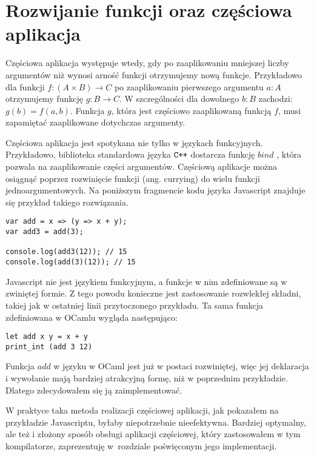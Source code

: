 \documentclass[declaration,shortabstract]{iithesis}
\begin{document}

\section{Rozwijanie funkcji oraz częściowa aplikacja}

Częściowa aplikacja występuje wtedy, gdy po zaaplikowaniu mniejszej liczby 
argumentów niż wynosi arność funkcji otrzymujemy nową funkcje. Przykładowo 
dla funkcji $f: (A \times B) \rightarrow C$ po zaaplikowaniu pierwszego 
argumentu $a : A$ otrzymujemy funkcję $g : B \rightarrow C$. W szczególności
dla dowolnego $b : B$ zachodzi: $g(b) = f(a, b)$. Funkcja $g$, która jest 
częściowo zaaplikowaną funkcją $f$, musi zapamiętać zaaplikowane dotychczas 
argumenty. 

Częściowa aplikacja jest spotykana nie tylko w językach funkcyjnych. 
Przykładowo, biblioteka standardowa języka $\verb!C++!$ dostarcza funkcję
$bind$ \cite{cpp_bind}, która pozwala na zaaplikowanie części argumentów. 
Częściową aplikacje można osiągnąć poprzez rozwinięcie funkcji (ang. currying) 
do wielu funkcji jednoargumentowych. Na poniższym fragmencie kodu języka 
Javascript znajduje się przykład takiego rozwiązania.

\begin{lstlisting}[frame=single, caption=Rozwinięcie funkcji w Javascriptcie.]
var add = x => (y => x + y);
var add3 = add(3);

console.log(add3(12)); // 15
console.log(add(3)(12)); // 15
\end{lstlisting}

Javascript nie jest językiem funkcyjnym, a funkcje w nim zdefiniowane są w 
zwiniętej formie. Z tego powodu konieczne jest zastosowanie rozwlekłej składni,
takiej jak w ostatniej linii przytoczonego przykładu. Ta sama funkcja 
zdefiniowana w OCamlu wygląda następująco:

\begin{lstlisting}[frame=single, caption=Rozwinięta funkcja w OCamlu.]
let add x y = x + y 
print_int (add 3 12)
\end{lstlisting}

Funkcja $add$ w języku w OCaml jest już w postaci rozwiniętej, więc jej 
deklaracja i wywołanie mają bardziej atrakcyjną formę, niż w poprzednim 
przykładzie. Dlatego zdecydowałem się ją zaimplementować.

W praktyce taka metoda realizacji częściowej aplikacji, jak pokazałem na 
przykładzie Javascriptu, byłaby niepotrzebnie nieefektywna. Bardziej optymalny,
ale też i złożony sposób obsługi aplikacji częściowej, który zastosowałem w tym 
kompilatorze, zaprezentuję w~rozdziale poświęconym jego implementacji.
\end{document}
